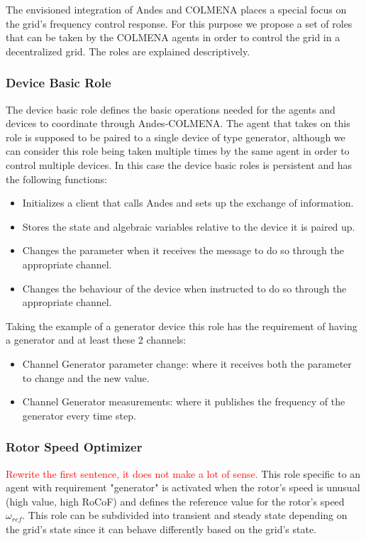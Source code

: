 \documentclass{article}
\begin{document}
The envisioned integration of Andes and COLMENA places a special focus on the grid's frequency control response. For this purpose we propose a set of roles that can be taken by the COLMENA agents in order to control the grid in a decentralized grid. The roles are explained descriptively.  

\subsubsection*{Device Basic Role}

The device basic role defines the basic operations needed for the agents and devices to coordinate through Andes-COLMENA. The agent that takes on this role is supposed to be paired to a single device of type generator, although we can consider this role being taken multiple times by the same agent in order to control multiple devices. In this case the device basic roles is persistent and has the following functions:

 \begin{itemize}
     \item Initializes a client that calls Andes and sets up the exchange of information.
     \item Stores the state and algebraic variables relative to the device it is paired up.
     \item Changes the parameter when it receives the message to do so through the appropriate channel.
     \item Changes the behaviour of the device when instructed to do so through the appropriate channel.
 \end{itemize}

Taking the example of a generator device this role has the requirement of having a generator and at least these 2 channels:

\begin{itemize}
    \item Channel Generator parameter change: where it receives both the parameter to change and the new value.
    \item Channel Generator measurements: where it publishes the frequency of the generator every time step.
\end{itemize}

\subsubsection*{Rotor Speed Optimizer}

\textcolor{red}{Rewrite the first sentence, it does not make a lot of sense.}
This role specific to an agent with requirement "generator" is activated when the rotor's speed is unusual (high value, high RoCoF) and defines the reference value for the rotor's speed $\omega_{ref}$. This role can be subdivided into transient and steady state depending on the grid's state since it can behave differently based on the grid's state.  
\end{document}
